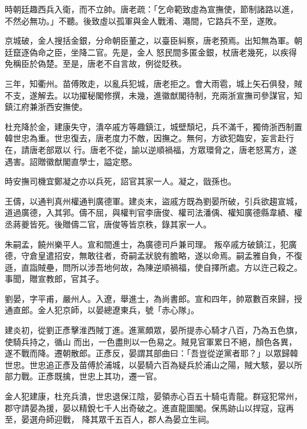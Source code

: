 \begin{pinyinscope}
 時朝廷趣西兵入衛，而不立帥。唐老疏：「乞命範致虛為宣撫使，節制諸路以進，不然必無功。」不聽。後致虛以孤軍與金人戰淆、澠間，它路兵不至，遂敗。



 京城破，金人搜括金銀，分命朝臣董之，以臺臣糾察，唐老預焉。出知無為軍。朝廷竄逐偽命之臣，坐降二官。先是，金人
 怒民間多匿金銀，杖唐老幾死，以疾得免稱臣於偽楚。至是，唐老不自言故，例從貶秩。



 三年，知衢州。苗傅敗走，以亂兵犯城，唐老拒之。會大雨雹，城上矢石俱發，賊不支，遂解去。以功擢秘閣修撰，未幾，進徽猷閣待制，充兩浙宣撫司參謀官，知鎮江府兼浙西安撫使。



 杜充降於金，建康失守，潰卒戚方等趣鎮江，城壁頹圮，兵不滿千，獨倚浙西制置韓世忠為重。世忠復去，唐老度力不敵，因撫之。無何，方欲犯臨安，妄言赴行在，請唐老部眾以
 行。唐老不從，諭以逆順禍福，方眾環脅之，唐老怒罵方，遂遇害。詔贈徽猷閣直學士，謚定愍。



 時安撫司機宜鄭凝之亦以兵死，詔官其家一人。凝之，戩孫也。



 王儔，以通判真州權通判廣德軍。建炎末，盜戚方既為劉晏所破，引兵欲趨宣城，道過廣德，入其郛。儔不屈，與權判官李唐俊、權司法潘偊、權知廣德縣韋績、權丞蔣夔皆死。後贈儔二官，唐俊等皆京秩，錄其家一人。



 朱嗣孟，饒州樂平人。宣和間進士，為廣德司戶兼司理。
 叛卒戚方破鎮江，犯廣德，守倉皇遣招安，無敢往者，奇嗣孟狀貌有膽略，遂以命焉。嗣孟雅自負，不復遜，直詣賊壘，問所以涉吾地何故，為陳逆順禍福，使自擇所處。方以迕己殺之。事聞，贈宣教郎，官其子。



 劉晏，字平甫，嚴州人。入遼，舉進士，為尚書郎。宣和四年，帥眾數百來歸，授通直郎。金人犯京師，以晏總遼東兵，號「赤心隊」。



 建炎初，從劉正彥擊淮西賊丁進。進黨頗眾，晏所提赤心騎才八百，乃為五色旗，使騎兵持之，循山
 而出，一色盡則以一色易之。賊見官軍累日不絕，顏色各異，遂不戰而降。遷朝散郎。正彥反，晏謂其部曲曰：「吾豈從逆黨者耶？」以眾歸韓世忠。世忠追正彥及苗傅於浦城，以晏騎六百為疑兵於浦山之陽，賊大駭，晏以所部力戰。正彥既擒，世忠上其功，遷一官。



 金人犯建康，杜充兵潰，世忠退保江陰，晏領赤心百五十騎屯青龍。群寇犯常州，郡守請晏為援，晏以精銳七千人出奇破之。進直龍圖閣。保馬跡山以捍寇，寇再至，晏選舟師迎戰，
 降其眾千五百人，郡人為晏立生祠。




\end{pinyinscope}
